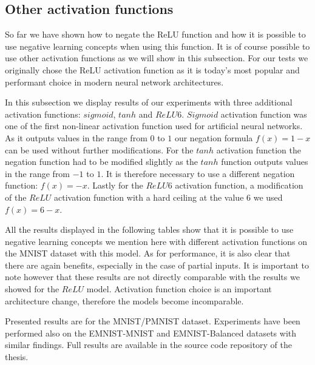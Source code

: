 \documentclass[b5paper]{book}
\begin{document}
\subsection{Other activation functions}

So far we have shown how to negate the ReLU function and how it is possible to use negative learning concepts when using this function. It is of course possible to use other activation functions as we will show in this subsection. For our tests we originally chose the ReLU activation function as it is today's most popular and performant choice in modern neural network architectures.

In this subsection we display results of our experiments with three additional activation functions: \( sigmoid \), \( tanh \) and \( ReLU6 \). \( Sigmoid \) activation function was one of the first non-linear activation function used for artificial neural networks. As it outputs values in the range from \( 0 \) to \( 1 \) our negation formula \( f(x) = 1 - x \) can be used without further modifications. For the \( tanh \) activation function the negation function had to be modified slightly as the \( tanh \) function outputs values in the range from \( -1 \) to \( 1 \). It is therefore necessary to use a different negation function: \( f(x) = -x \). Lastly for the \( ReLU6 \) activation function, a modification of the \( ReLU \) activation function with a hard ceiling at the value \( 6 \) we used \( f(x) = 6 - x \).

All the results displayed in the following tables show that it is possible to use negative learning concepts we mention here with different activation functions on the MNIST dataset with this model. As for performance, it is also clear that there are again benefits, especially in the case of partial inputs. It is important to note however that these results are not directly comparable with the results we showed for the \( ReLU \) model. Activation function choice is an important architecture change, therefore the models become incomparable. 

Presented results are for the MNIST/PMNIST dataset. Experiments have been performed also on the EMNIST-MNIST and EMNIST-Balanced datasets with similar findings. Full results are available in the source code repository of the thesis.
\end{document}
